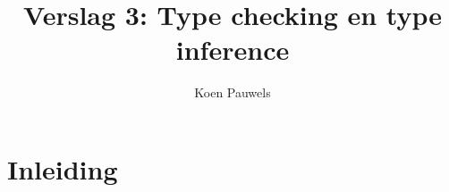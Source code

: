 \documentclass[a4paper,10pt]{article}
\begin{document}
\lstset{language=Haskell}
\title{Verslag 3: Type checking en type inference}
\author{Koen Pauwels}
\maketitle

\section{Inleiding}
\end{document}
